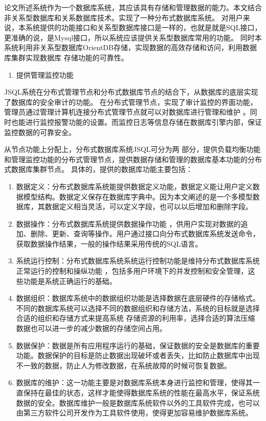	论文所述系统作为一个数据库系统，其应该具有存储和管理数据的能力。本文结合非关系型数据库和关系数据库技术。实现了一种分布式数据库系统。
	对用户来说，本系统提供的功能接口和关系型数据库接口是一样的，也就是就是SQL接口，
	更准确的说，是Mysql接口，所以系统应该提供关系型数据库常用的功能。
	同时本系统利用非关系型数据库OrientDB存储，实现数据的高效存储和访问，利用数据库集群实现数据库
	存储功能的可靠性。
	
	\begin{enumerate}[resume]
		\item 提供管理监控功能
	\end{enumerate}

	JSQL系统在分布式管理节点和分布式数据库节点的结合下，从数据库的底层实现了数据库的安全审计的功能。
	在分布式管理节点，实现了审计监控的界面功能，管理员通过管理计算机连接分布式管理节点就可以对数据库进行管理和维护
	。同时也能进行监控报警功能的设置。而监控日志等信息存储在数据库引擎内部，保证监控数据的可靠安全。


	从节点功能上分配上，分布式数据库系统JSQL可分为两
	部分，提供负载均衡功能和管理监控功能的分布式管理节点，提供数据存储和管理的数据库基本功能的分布式数据库集群节点。
具体的，提供的数据库功能主要包括：
\begin{enumerate}[fullwidth,itemindent=2em,listparindent=2em]
	\item 数据定义：分布式数据库系统能提供数据定义功能，数据定义能让用户定义数据模型结构。数据定义保存在数据库字典中。因为本文阐述的是一个多模型数据库，其数据定义相当灵活，可以定义字段，也可以以后增加和删除字段。
	\item 数据操作：分布式数据库系统提供数据操作功能
	，供用户实现对数据的追加、删除、更新、查询等操作。用户通过接口向分布式数据库系统发送命令，获取数据操作结果，一般的操作结果采用传统的SQL语言。
	\item 系统运行控制：分布式数据库系统系统运行控制功能是维持分布式数据库系统正常运行的控制和操纵功能
	，包括多用户环境下的并发控制和安全管理，这些功能是系统正确运行的基础。
	\item 数据组织：数据库系统中的数据组织功能是选择数据在底层硬件的存储格式。
	不同的数据库系统可以选择不同的数据组织和存储方法，系统的目标就是选择合适的组织和存储方式来提高系统
	存储资源的利用率，选择合适的算法压缩数据也可以进一步的减少数据的存储空间占用。
	\item   数据保护：数据是所有应用程序运行的基础，保证数据的安全是数据库的重要功能。数据保护的目标是防止数据出现破坏或者丢失，比如防止数据库中出现不一致的数据，防止人为修改数据，在系统故障的时候可恢复数据。
	\item  数据库的维护：这一功能主要是对数据库系统本身进行监控和管理，使得其一直保持在最佳的状态，这样才能使得数据库系统的性能在最高水平，保证系统数据的安全。数据库维护一般是数据库系统软件以外的工具软件完成，也可以由第三方软件公司开发作为工具软件使用，使得更加容易维护数据库系统。
\end{enumerate}
